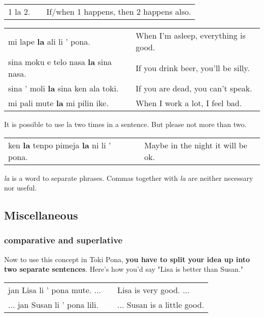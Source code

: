 \begin{supertabular}{p{5,5cm}|ll}
1 la 2. && If/when 1 happens, then 2 happens also. \\  %
\end{supertabular} 

\begin{supertabular}{p{5,5cm}|ll}
mi lape \textbf{la} ali li ' pona. && When I'm asleep, everything is good. \\
sina moku e telo nasa \textbf{la} sina nasa. && If you drink beer, you'll be silly. \\
sina ' moli \textbf{la} sina ken ala toki. && If you are dead, you can't speak. \\
mi pali mute \textbf{la} mi pilin ike. && When I work a lot, I feel bad. \\
\end{supertabular} 

It is possible to use la two times in a sentence. But please not more than two. 

\begin{supertabular}{p{5,5cm}|ll}
ken \textbf{la} tenpo pimeja \textbf{la} ni li ' pona. && Maybe in the night it will be ok. \\  
\end{supertabular} 

\textit{la} is a word to separate phrases. Commas together with \textit{la} are neither necessary nor useful. 

%
\subsection*{Miscellaneous}
\subsubsection*{comparative and superlative} 
%
Now to use this concept in Toki Pona, \textbf{you have to split your idea up into two separate sentences}. 
Here's how you'd say "Lisa is better than Susan."

\begin{supertabular}{p{5,5cm}|ll}
jan Lisa li ' pona mute. ...  && Lisa is very good. ... \\ %
... jan Susan li ' pona lili. && ... Susan is a little good. \\ %
\end{supertabular} 

